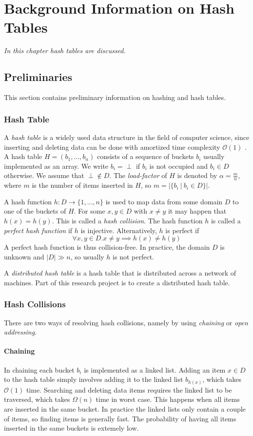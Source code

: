 \chapter{Background Information on Hash Tables}
\textit{In this chapter hash tables are discussed.}

\section{Preliminaries}
This section contains preliminary information on hashing and hash tables.

\subsection{Hash Table}
A \emph{hash table} is a widely used data structure in the field of computer science, since inserting and deleting data can be done with amortized time complexity $\mathcal{O}(1)$ \cite{DBLP:conf/vldb/Litwin80}. A hash table $H = (b_1, \dots, b_n)$ consists of a sequence of buckets $b_i$ usually implemented as an array. We write $b_i = \perp$ if $b_i$ is not occupied and $b_i \in D$ otherwise. We assume that $\perp \not \in D$. The \emph{load-factor} of $H$ is denoted by $\alpha = \frac{m}{n}$, where $m$ is the number of items inserted in $H$, so $m = |\{ b_i \ | \ b_i \in D \}|$.

A hash function $h : D \rightarrow \{ 1, \dots, n \}$ is used to map data from some domain $D$ to one of the buckets of $H$. For some $x,y \in D$ with $x \not = y$ it may happen that $h(x) = h(y)$. This is called a \emph{hash collision}. The hash function $h$ is called a \emph{perfect hash function} if $h$ is injective. Alternatively, $h$ is perfect if $$\forall x, y \in D. x \not = y \implies h(x) \not = h(y)$$ A perfect hash function is thus collision-free. In practice, the domain $D$ is unknown and $|D| \gg n$, so usually $h$ is not perfect. 

A \emph{distributed hash table} is a hash table that is distributed across a network of machines. Part of this research project is to create a distributed hash table.

\subsection{Hash Collisions}
There are two ways of resolving hash collisions, namely by using \emph{chaining} or \emph{open addressing}. 

\subsubsection{Chaining}
In chaining each bucket $b_i$ is implemented as a linked list. Adding an item $x \in D$ to the hash table simply involves adding it to the linked list $b_{h(x)}$, which takes $\mathcal{O}(1)$ time. Searching and deleting data items requires the linked list to be traversed, which takes $\Omega(n)$ time in worst case. This happens when all items are inserted in the same bucket. In practice the linked lists only contain a couple of items, so finding items is generally fast. The probability of having all items inserted in the same buckets is extemely low.

